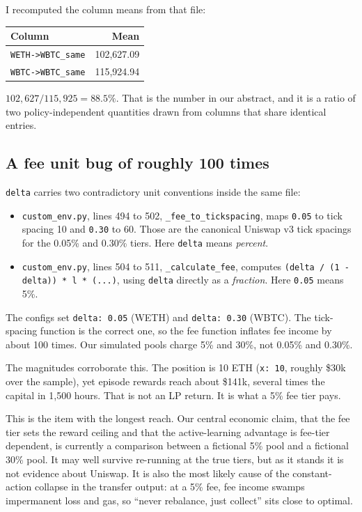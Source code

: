 \documentclass[11pt,a4paper]{article}
\newcommand{\code}[1]{\texttt{\small #1}}
\begin{document}
I recomputed the column means from that file:

\begin{center}
\begin{tabular}{lr}
\toprule
Column & Mean \\
\midrule
\code{WETH->WBTC\_same} & 102{,}627.09 \\
\code{WBTC->WBTC\_same} & 115{,}924.94 \\
\bottomrule
\end{tabular}
\end{center}

\noindent $102{,}627 / 115{,}925 = 88.5\%$. That is the number in our abstract, and it is a ratio
of two policy-independent quantities drawn from columns that share identical entries.

\subsection{A fee unit bug of roughly 100 times}

\code{delta} carries two contradictory unit conventions inside the same file:

\begin{itemize}
  \item \code{custom\_env.py}, lines 494 to 502, \code{\_fee\_to\_tickspacing}, maps \code{0.05} to tick
        spacing 10 and \code{0.30} to 60. Those are the canonical Uniswap v3 tick spacings for the
        0.05\% and 0.30\% tiers. Here \code{delta} means \emph{percent}.
  \item \code{custom\_env.py}, lines 504 to 511, \code{\_calculate\_fee}, computes
        \code{(delta / (1 - delta)) * l * (...)}, using \code{delta} directly as a \emph{fraction}.
        Here \code{0.05} means 5\%.
\end{itemize}

The configs set \code{delta: 0.05} (WETH) and \code{delta: 0.30} (WBTC). The tick-spacing function
is the correct one, so the fee function inflates fee income by about 100 times. Our simulated pools
charge 5\% and 30\%, not 0.05\% and 0.30\%.

The magnitudes corroborate this. The position is 10 ETH (\code{x: 10}, roughly \$30k over the
sample), yet episode rewards reach about \$141k, several times the capital in 1{,}500 hours. That
is not an LP return. It is what a 5\% fee tier pays.

This is the item with the longest reach. Our central economic claim, that the fee tier sets the
reward ceiling and that the active-learning advantage is fee-tier dependent, is currently a
comparison between a fictional 5\% pool and a fictional 30\% pool. It may well survive re-running
at the true tiers, but as it stands it is not evidence about Uniswap. It is also the most likely
cause of the constant-action collapse in the transfer output: at a 5\% fee, fee income swamps
impermanent loss and gas, so ``never rebalance, just collect'' sits close to optimal.
\end{document}
